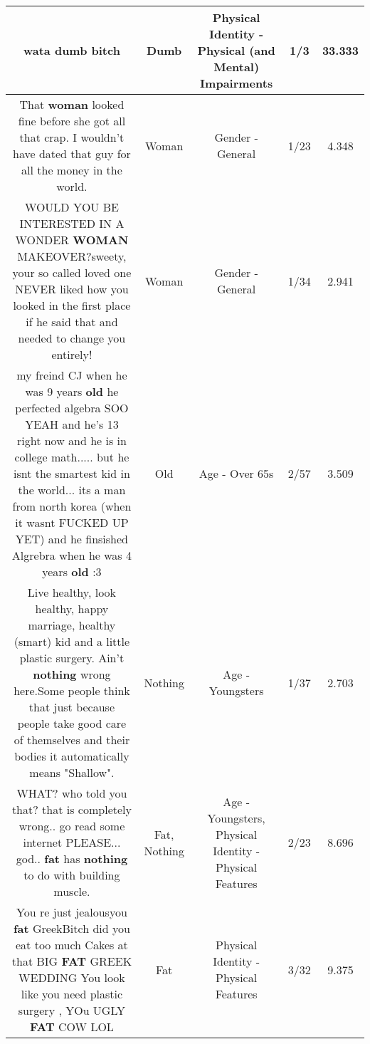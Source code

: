 \documentclass[11pt]{article}
\newlength\mylength
\begin{document}
\begin{center}
\begin{longtable}{|C{.65\mylength}|C{.30\mylength}|C{.12\mylength}|C{.12\mylength}|C{.12\mylength}|}
  \small wata \textbf{dumb} bitch\normalsize   & Dumb & Physical Identity - Physical (and Mental) Impairments & 1/3 & 33.333 \\  \hline
  \small That \textbf{woman} looked fine before she got all that crap.  I wouldn't have dated that guy for all the money in the world.\normalsize   & Woman & Gender - General & 1/23 & 4.348 \\  \hline
  \small WOULD YOU BE INTERESTED IN A WONDER \textbf{WOMAN} MAKEOVER?sweety, your so called loved one NEVER liked how you looked in the first place if he said that and needed to change you entirely!\normalsize   & Woman & Gender - General & 1/34 & 2.941 \\  \hline
  \small my freind CJ when he was 9 years \textbf{old} he perfected algebra SOO YEAH and he's 13 right now and he is in college math..... but he isnt the smartest kid in the world... its a man from north korea (when it wasnt FUCKED UP YET) and he finsished Algrebra when he was 4 years \textbf{old} :3\normalsize   & Old & Age - Over 65s & 2/57 & 3.509 \\  \hline
  \small Live healthy, look healthy, happy marriage, healthy (smart) kid and a little plastic surgery. Ain't \textbf{nothing} wrong here.Some people think that just because people take good care of themselves and their bodies it automatically means "Shallow".\normalsize   & Nothing & Age - Youngsters & 1/37 & 2.703 \\  \hline
  \small WHAT? who told you that? that is completely wrong.. go read some internet PLEASE... god.. \textbf{fat} has \textbf{nothing} to do with building muscle.\normalsize   & Fat, Nothing & Age - Youngsters, Physical Identity - Physical Features & 2/23 & 8.696 \\  \hline
  \small You re just jealousyou \textbf{fat} GreekBitch did you eat too much Cakes at that BIG \textbf{FAT} GREEK WEDDING You look like you need plastic surgery , YOu UGLY \textbf{FAT} COW LOL\normalsize   & Fat & Physical Identity - Physical Features & 3/32 & 9.375 \\  \hline

\end{longtable}
\end{center}
\end{document}
